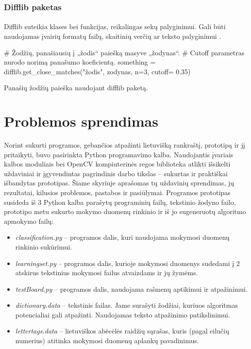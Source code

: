 \documentclass[a4paper,12pt]{article}
\begin{document}
\subsubsection{Difflib paketas}
\paragraph{} Difflib suteikia klases bei funkcijas, reikalingas sekų palyginimui. Gali būti naudojamas įvairių formatų failų, skaitinių verčių ar teksto palyginimui \cite{DIFFLIB}.
	\begin{listing}[H]
		\begin{pythoncode}
# Žodžių, panašiausių į „žodis“ paiešką masyve „žodynas“. 
# Cutoff parametras nurodo norimą panašumo koeficientą.
something = difflib.get_close_matches("žodis", zodynas, n=3, cutoff= 0.35) 
		\end{pythoncode}
		\caption{Panašių žodžių paieška naudojant difflib paketą.}	
	\end{listing}

\clearpage
\section{Problemos sprendimas}

\paragraph{} Norint sukurti programos, gebančios atpažinti lietuvišką rankraštį, prototipą ir jį pritaikyti, buvo pasirinkta Python programavimo kalba. Naudojantis įvariais kalbos moduliais bei OpenCV kompiuterinės regos biblioteka atlikti išsikelti uždaviniai ir įgyvendintas pagrindinis darbo tikslas – sukurtas ir praktiškai išbandytas prototipas. Šiame skyriuje aprašomas tų uždavinių sprendimas, jų rezultatai, kilusios problemos, pastabos ir pasiūlymai.
Programos prototipas susideda iš 3 Python kalba parašytų programinių failų, tekstinio žodyno failo, prototipo metu sukurto mokymo duomenų rinkinio ir iš jo sugeneruotų algoritmo apmokymo failų:
\begin{itemize}
	\item \textit{classification.py} – programos dalis, kuri naudojama mokymosi duomenų rinkinio sukūrimui.
	\item \textit{learningset.py} – programos dalis, kurioje mokymosi duomenys sudedami į 2 atskirus tekstinius mokymosi failus atvaizdams ir jų žymėms.
	\item \textit{testBoard.py} – programos dalis, naudojama rašmenų aptikimui ir atpažinimui.
	\item \textit{dictionary.data} – tekstinis failas. Jame surašyti žodžiai, kuriuos algoritmas potencialiai gali atpažinti. Naudojamas teksto atpažinimo patikslinimui.
	\item \textit{lettertags.data} – lietuviškos abėcėlės raidžių sąrašas, kuris (pagal eilučių numerius) atitinka mokymosi duomenų aplankų pavadinimus.
\end{itemize}	
\end{document}
